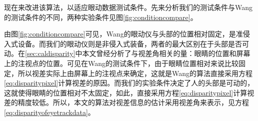 现在来改进该算法，以适应眼动数据测试条件。先来分析我们的测试条件与Wang的测试条件的不同，两种实验条件见图\ref{fig:conditioncompare}。
\begin{figure}
  \centering
  \hspace{1in}
\end{figure}
\begin{figure}[t]
  \centering
\end{figure}
由图\ref{fig:conditioncompare}可见，Wang的眼动仪与头部的位置相对固定，是准侵入式设备。而我们的眼动仪则是非侵入式装备，两者的最大区别在于头部是否可动。在\ref{sec:caldisparity}中本文曾经分析了与视差角相关的量：眼睛的位置和屏幕上的注视点的位置。可见在Wang的测试条件下，由于眼睛位置相对来说比较固定，所以视差实际上由屏幕上的注视点来确定，这就是Wang的算法直接采用方程\ref{eq:disparitypixel}计算视差的原因。而我们的实验条件决定了人的头部是可动的，这就使得眼睛的位置相对不太固定，如此，直接采用方程\ref{eq:disparitypixel}计算视差的精度较低。所以，本文的算法对视差信息的估计采用视差角来表示，见方程\ref{eq:disparityofeyetrackdata}。

